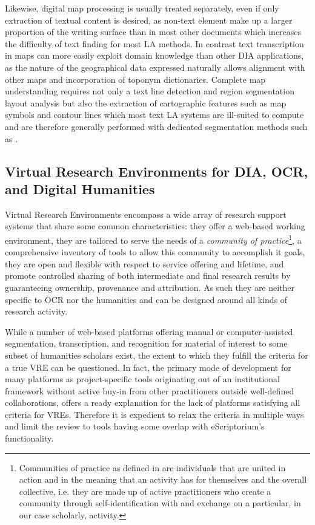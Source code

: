 Likewise, digital map processing is usually treated separately, even if only
extraction of textual content is desired, as non-text element make up a larger
proportion of the writing surface than in most other documents which increases
the difficulty of text finding for most LA methods. In contrast text
transcription in maps can more easily exploit domain knowledge than other DIA
applications, as the nature of the geographical data expressed naturally allows
alignment with other maps and incorporation of toponym
dictionaries\cite{weinman2013toponym,weinman17geographic,sun2020aligning}.
Complete map understanding requires not only a text line detection and region
segmentation layout analysis but also the extraction of cartographic features
such as map symbols and contour lines which most text LA systems are ill-suited
to compute and are therefore generally performed with dedicated segmentation
methods such as \cite{uhl2018spatialising,liu2020superpixel}.

\subsection{Virtual Research Environments for DIA, OCR, and Digital Humanities}

Virtual Research Environments encompass a wide array of research support
systems that share some common characteristics: they offer a web-based working
environment, they are tailored to serve the needs of a \emph{community of
practice}\footnote{Communities of practice as defined in
\cite{wenger1999communities} are individuals that are united in action and in
the meaning that an activity has for themselves and the overall collective,
i.e. they are made up of active practitioners who create a community through
self-identification with and exchange on a particular, in our case scholarly,
activity.}, a comprehensive inventory of tools to allow this community to
accomplish it goals, they are open and flexible with respect to service
offering and lifetime, and promote controlled sharing of both intermediate and
final research results by guaranteeing ownership, provenance and
attribution\cite{candela2013virtual}. As such they are neither specific to OCR
nor the humanities and can be designed around all kinds of research activity.

While a number of web-based platforms offering manual or computer-assisted
segmentation, transcription, and recognition for material of interest to some
subset of humanities scholars exist, the extent to which they fulfill the
criteria for a true VRE can be questioned. In fact, the primary mode of
development for many platforms as project-specific tools originating out of an
institutional framework without active buy-in from other practitioners outside
well-defined collaborations, offers a ready explanation for the lack of
platforms satisfying all criteria for VREs. Therefore it is expedient to relax
the criteria in multiple ways and limit the review to tools having some overlap
with eScriptorium's functionality.

